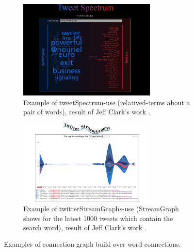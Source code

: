 \documentclass[a4paper,11pt,oneside]{article}
\begin{document}
\begin{figure}[htbp]
  \begin{subfigure}[h]{\textwidth}
    \centering
    \includegraphics[width=0.76\textwidth]{./image/tweetSpectrum.jpg}
    \caption{Example of tweetSpectrum-use (relatived-terms about a pair of words), result of Jeff Clark's work \cite{clark2}.}
    \label{fig:tweetSpectrum}
  \end{subfigure}
  \hspace{8mm}
  \begin{subfigure}[h]{\textwidth}
    \centering
    \includegraphics[width=0.76\textwidth]{./image/twitterStreamGraphs.png}
    \caption{Example of twitterStreamGraphs-use (StreamGraph shows for the latest 1000 tweets which contain the search word), result of Jeff Clark's work \cite{clark1}.}
    \label{fig:twitterStreamGraphs}
   \end{subfigure}
   \caption{Examples of connection-graph build over word-connections.}
  \label{fig:wordsGraph}
\end{figure}
\end{document}
